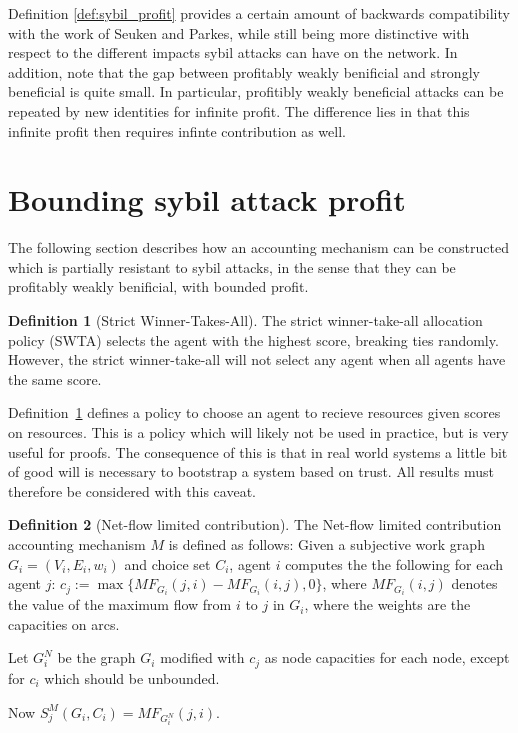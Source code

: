 \documentclass[a4paper,11pt]{book}
\theoremstyle{definition}
\newtheorem{definition}{Definition}
\begin{document}
Definition \ref{def:sybil_profit} provides a certain amount of backwards compatibility with the work
of Seuken and Parkes, while still being more distinctive with respect to the different impacts
sybil attacks can have on the network. In addition, note that the gap between profitably weakly
benificial and strongly beneficial is quite small. In particular, profitibly weakly beneficial
attacks can be repeated by new identities for infinite profit. The difference lies in that
this infinite profit then requires infinte contribution as well.

\section{Bounding sybil attack profit}

The following section describes how an accounting mechanism can be constructed which is partially
resistant to sybil attacks, in the sense that they can be profitably weakly benificial, with bounded
profit.

\begin{definition}[Strict Winner-Takes-All]
   \label{def:SWTA}
   The strict winner-take-all allocation policy (SWTA) selects the agent with the highest score,
   breaking ties randomly. However, the strict winner-take-all will not select any agent
   when all agents have the same score.
\end{definition}

Definition~\ref{def:SWTA} defines a policy to choose an agent to recieve resources given scores
on resources. This is a policy which will likely not be used in practice, but is very useful
for proofs. The consequence of this is that in real world systems a little bit of good will
is necessary to bootstrap a system based on trust. All results must therefore be considered
with this caveat. 

\begin{definition}[Net-flow limited contribution]
    The Net-flow limited contribution accounting mechanism $M$ is defined as follows:
    Given a subjective work graph $G_i = (V_i, E_i, w_i)$ and choice set $C_i$, agent
    $i$ computes the the following for each agent $j$: 
    $c_j := \max\{MF_{G_i}(j,i) - MF_{G_i}(i,j), 0\}$, where $MF_{G_i}(i,j)$ denotes
    the value of the maximum flow from $i$ to $j$ in $G_i$, where the weights are
    the capacities on arcs.

    Let $G_i^N$ be the graph $G_i$ modified with $c_j$ as node capacities for each node,
    except for $c_i$ which should be unbounded.

    Now $S^M_j(G_i, C_i) = MF_{G_i^N}(j, i)$.
\end{definition}
\end{document}

